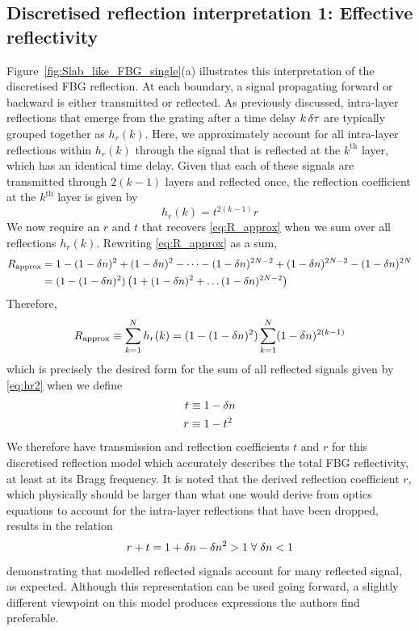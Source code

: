 \subsection{Discretised reflection interpretation 1: Effective reflectivity}
%
Figure~\ref{fig:Slab_like_FBG_single}(a) illustrates this interpretation of the discretised FBG reflection. At each boundary, a signal propagating forward or backward is either transmitted or reflected. As previously discussed, intra-layer reflections that emerge from the grating after a time delay $k \, \delta \tau$ are typically grouped together as $h_r(k)$. Here, we approximately account for all intra-layer reflections within $h_r(k)$ through the signal that is reflected at the $k^\text{th}$ layer, which has an identical time delay. Given that each of these signals are transmitted through $2(k-1)$ layers and reflected once, the reflection coefficient at the $k^{\text{th}}$ layer is given by
%
\begin{equation}
    \label{eq:hr2}
    h_r(k) = t^{2(k-1)}r
\end{equation}
%
We now require an $r$ and $t$ that recovers \eqref{eq:R_approx} when we sum over all reflections $h_r(k)$. Rewriting \eqref{eq:R_approx} as a sum,
%
\begin{align*}
    R_\text{approx} &= 1 - (1-\delta n)^2 + (1-\delta n)^2 - \dots - (1-\delta n)^{2N-2} + (1-\delta n)^{2N-2} - (1-\delta n)^{2N}
    \\
    &= (1-(1-\delta n)^2) \left( 1 + (1-\delta n)^2 + \dots (1-\delta n)^{2N-2} \right)
\end{align*}
%
Therefore,
%
\begin{equation*}
    R_\text{approx} \equiv \sum_{k=1}^{N} h_r(k) = (1-(1-\delta n)^2)\sum_{k=1}^{N} (1-\delta n)^{2(k-1)}
\end{equation*}
%
%
which is precisely the desired form for the sum of all reflected signals given by \eqref{eq:hr2} when we define
%
\begin{align*}
    t &\equiv 1-\delta n
    \\
    r &\equiv 1-t^2
\end{align*}
%
We therefore have transmission and reflection coefficients $t$ and $r$ for this discretised reflection model which accurately describes the total FBG reflectivity, at least at its Bragg frequency. It is noted that the derived reflection coefficient $r$, which physically should be larger than what one would derive from optics equations to account for the intra-layer reflections that have been dropped, results in the relation
%
\begin{equation*}
    r + t = 1 + \delta n - \delta n^2 > 1 \; \forall \; \delta n<1
\end{equation*}
%
demonstrating that modelled reflected signals account for many reflected signal, as expected. Although this representation can be used going forward, a slightly different viewpoint on this model produces expressions the authors find preferable.
%
\par
%
